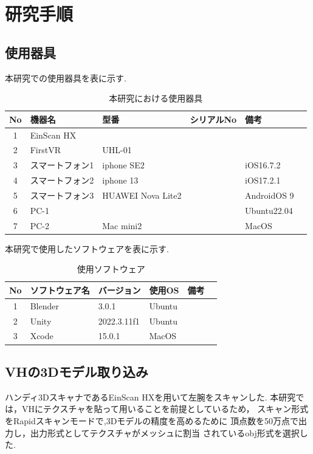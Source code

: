 \documentclass{ltjsreport}
\begin{document}
\chapter{研究手順}
	\section{使用器具}
		本研究での使用器具を表に示す.
	\begin{table}[H]
	\begin{center}
	\caption{本研究における使用器具}
	\label{tab:usedev}
	\begin{tabular}{clllll} \toprule
	No&\multicolumn{1}{l}{機器名}&\multicolumn{1}{l}{型番}&\multicolumn{1}{l}{シリアルNo}&\multicolumn{1}{l}{備考}\\ \hline
	1&EinScan HX&&&\\
	2&FirstVR&UHL-01&&\\
	3&スマートフォン1&iphone SE2&&iOS16.7.2\\
	4&スマートフォン2&iphone 13&&iOS17.2.1\\
	5&スマートフォン3&HUAWEI Nova Lite2&&AndroidOS 9\\
	6&PC-1&&&Ubuntu22.04\\
	7&PC-2&Mac mini2&&MacOS\\
	\bottomrule
	\end{tabular}
	\end{center}
	\end{table}
	本研究で使用したソフトウェアを表に示す.
	\begin{table}[H]
	\begin{center}
	\caption{使用ソフトウェア}
	\label{tab:usesoft}
	\begin{tabular}{clllll} \toprule
	No&\multicolumn{1}{l}{ソフトウェア名}&\multicolumn{1}{l}{バージョン}&\multicolumn{1}{l}{使用OS}&\multicolumn{1}{l}{備考}\\ \hline
	1&Blender&3.0.1&Ubuntu&\\
	2&Unity&2022.3.11f1&Ubuntu&\\
	3&Xcode&15.0.1&MacOS&\\
	\bottomrule
	\end{tabular}
	\end{center}
	\end{table}
	\section{VHの3Dモデル取り込み}
		ハンディ3DスキャナであるEinScan HXを用いて左腕をスキャンした.
		本研究では，VHにテクスチャを貼って用いることを前提としているため，
		スキャン形式をRapidスキャンモードで,3Dモデルの精度を高めるために
		頂点数を50万点で出力し，出力形式としてテクスチャがメッシュに割当
		されているobj形式を選択した.
\end{document}
